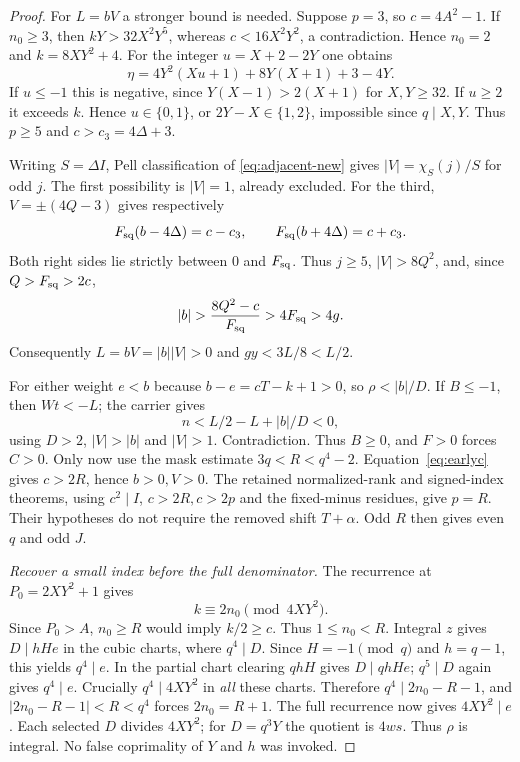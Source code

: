 \begin{proof}
For $L=bV$ a stronger bound is needed. Suppose $p=3$, so
$c=4A^2-1$. If $n_0\ge3$, then $kY>32X^2Y^5$, whereas
$c<16X^2Y^2$, a contradiction. Hence $n_0=2$ and $k=8XY^2+4$.
For the integer $u=X+2-2Y$ one obtains
\[
 \eta=4Y^2(Xu+1)+8Y(X+1)+3-4Y.
\]
If $u\le-1$ this is negative, since
$Y(X-1)>2(X+1)$ for $X,Y\ge32$.
If $u\ge2$ it exceeds $k$. Hence $u\in\{0,1\}$, or
$2Y-X\in\{1,2\}$, impossible since $q\mid X,Y$.
Thus $p\ge5$ and $c>c_3=4\Delta+3$.

Writing $S=\Delta I$, Pell classification of
\eqref{eq:adjacent-new} gives $|V|=\chi_S(j)/S$ for odd $j$.
The first possibility is $|V|=1$, already excluded. For the third,
$V=\pm(4Q-3)$ gives respectively
\[
 F_{\rm sq}(b-4\Delta)=c-c_3,\qquad
 F_{\rm sq}(b+4\Delta)=c+c_3.
\]
Both right sides lie strictly between $0$ and $F_{\rm sq}$.
Thus $j\ge5$, $|V|>8Q^2$, and, since $Q>F_{\rm sq}>2c$,
\[
 |b|>\frac{8Q^2-c}{F_{\rm sq}}>4F_{\rm sq}>4g.
\]
Consequently $L=bV=|b||V|>0$ and $gy<3L/8<L/2$.

For either weight $e<b$ because $b-e=cT-k+1>0$, so
$\rho<|b|/D$. If $B\le-1$, then $Wt<-L$; the carrier gives
\[
 n< L/2-L+|b|/D<0,
\]
using $D>2$, $|V|>|b|$ and $|V|>1$. Contradiction.
Thus $B\ge0$, and $F>0$ forces $C>0$.
Only now use the mask estimate $3q<R<q^4-2$.
Equation~\eqref{eq:earlyc} gives $c>2R$, hence $b>0,V>0$.
The retained normalized-rank and signed-index theorems, using
$c^2\mid I$, $c>2R,c>2p$ and the fixed-minus residues, give $p=R$.
Their hypotheses do not require the removed shift $T+\alpha$.
Odd $R$ then gives even $q$ and odd $J$.

\emph{Recover a small index before the full denominator.}
The recurrence at $P_0=2XY^2+1$ gives
\[
 k\equiv2n_0\pmod {4XY^2}.
\]
Since $P_0>A$, $n_0\ge R$ would imply $k/2\ge c$.
Thus $1\le n_0<R$. Integral $z$ gives $D\mid hHe$ in the cubic
charts, where $q^4\mid D$. Since $H=-1\pmod q$ and $h=q-1$,
this yields $q^4\mid e$.
In the partial chart clearing $qhH$ gives $D\mid qhHe$;
$q^5\mid D$ again gives $q^4\mid e$.
Crucially $q^4\mid4XY^2$ in \emph{all} these charts.
Therefore $q^4\mid2n_0-R-1$, and
$|2n_0-R-1|<R<q^4$ forces $2n_0=R+1$.
The full recurrence now gives $4XY^2\mid e$.
Each selected $D$ divides $4XY^2$; for $D=q^3Y$ the quotient is
$4ws$. Thus $\rho$ is integral. No false coprimality of $Y$ and $h$
was invoked.


\end{proof}
